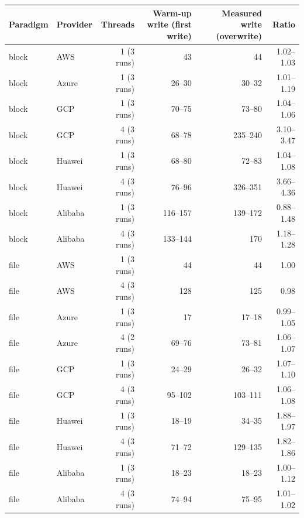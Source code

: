 \begin{tabular}{llrrrr}
\toprule
Paradigm & Provider & Threads & Warm-up write (first write) & Measured write (overwrite) & Ratio \\
\midrule
block & AWS & 1 (3 runs) & 43 & 44 & 1.02--1.03 \\
block & Azure & 1 (3 runs) & 26--30 & 30--32 & 1.01--1.19 \\
block & GCP & 1 (3 runs) & 70--75 & 73--80 & 1.04--1.06 \\
block & GCP & 4 (3 runs) & 68--78 & 235--240 & 3.10--3.47 \\
block & Huawei & 1 (3 runs) & 68--80 & 72--83 & 1.04--1.08 \\
block & Huawei & 4 (3 runs) & 76--96 & 326--351 & 3.66--4.36 \\
block & Alibaba & 1 (3 runs) & 116--157 & 139--172 & 0.88--1.48 \\
block & Alibaba & 4 (3 runs) & 133--144 & 170 & 1.18--1.28 \\
\midrule
file & AWS & 1 (3 runs) & 44 & 44 & 1.00 \\
file & AWS & 4 (3 runs) & 128 & 125 & 0.98 \\
file & Azure & 1 (3 runs) & 17 & 17--18 & 0.99--1.05 \\
file & Azure & 4 (2 runs) & 69--76 & 73--81 & 1.06--1.07 \\
file & GCP & 1 (3 runs) & 24--29 & 26--32 & 1.07--1.10 \\
file & GCP & 4 (3 runs) & 95--102 & 103--111 & 1.06--1.08 \\
file & Huawei & 1 (3 runs) & 18--19 & 34--35 & 1.88--1.97 \\
file & Huawei & 4 (3 runs) & 71--72 & 129--135 & 1.82--1.86 \\
file & Alibaba & 1 (3 runs) & 18--23 & 18--23 & 1.00--1.12 \\
file & Alibaba & 4 (3 runs) & 74--94 & 75--95 & 1.01--1.02 \\
\bottomrule
\end{tabular}
